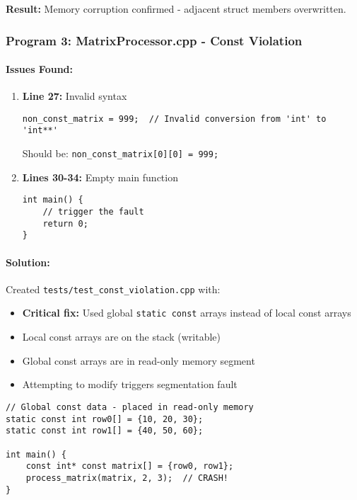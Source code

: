 \documentclass[11pt,a4paper]{article}
\begin{document}
\textbf{Result:} Memory corruption confirmed - adjacent struct members overwritten.

\subsubsection{Program 3: MatrixProcessor.cpp - Const Violation}

\paragraph{Issues Found:}

\begin{enumerate}
    \item \textbf{Line 27:} Invalid syntax
\begin{lstlisting}[style=cpp]
non_const_matrix = 999;  // Invalid conversion from 'int' to 'int**'
\end{lstlisting}
Should be: \texttt{non\_const\_matrix[0][0] = 999;}

    \item \textbf{Lines 30-34:} Empty main function
\begin{lstlisting}[style=cpp]
int main() {
    // trigger the fault
    return 0;
}
\end{lstlisting}
\end{enumerate}

\paragraph{Solution:}
Created \texttt{tests/test\_const\_violation.cpp} with:
\begin{itemize}
    \item \textbf{Critical fix:} Used global \texttt{static const} arrays instead of local const arrays
    \item Local const arrays are on the stack (writable)
    \item Global const arrays are in read-only memory segment
    \item Attempting to modify triggers segmentation fault
\end{itemize}

\begin{lstlisting}[style=cpp]
// Global const data - placed in read-only memory
static const int row0[] = {10, 20, 30};
static const int row1[] = {40, 50, 60};

int main() {
    const int* const matrix[] = {row0, row1};
    process_matrix(matrix, 2, 3);  // CRASH!
}
\end{lstlisting}
\end{document}
